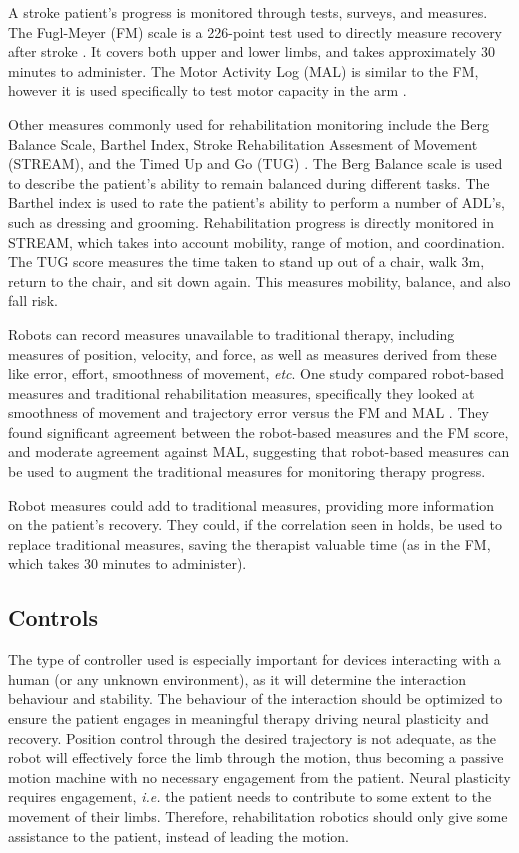 \documentclass[12pt]{report}
\begin{document}
	A stroke patient's progress is monitored through tests, surveys, and measures. The Fugl-Meyer (FM) scale is a 226-point test used to directly measure recovery after stroke \cite{Gladstone2002}. It covers both upper and lower limbs, and takes approximately 30 minutes to administer. The Motor Activity Log (MAL) is similar to the FM, however it is used specifically to test motor capacity in the arm \cite{Uswatte2006}.

Other measures commonly used for rehabilitation monitoring include the Berg Balance Scale, Barthel Index, Stroke Rehabilitation Assesment of Movement (STREAM), and the Timed Up and Go (TUG) \cite{Salbach2001}. The Berg Balance scale is used to describe the patient's ability to remain balanced during different tasks. The Barthel index is used to rate the patient's ability to perform a number of ADL's, such as dressing and grooming. Rehabilitation progress is directly monitored in STREAM, which takes into account mobility, range of motion, and coordination. The TUG score measures the time taken to stand up out of a chair, walk 3m, return to the chair, and sit down again. This measures mobility, balance, and also fall risk. 

Robots can record measures unavailable to traditional therapy, including measures of position, velocity, and force, as well as measures derived from these like error, effort, smoothness of movement, \textit{etc}. One study compared robot-based measures and traditional rehabilitation measures, specifically they looked at smoothness of movement and trajectory error versus the FM and MAL \cite{Celik2008}. They found significant agreement between the robot-based measures and the FM score, and moderate agreement against MAL, suggesting that robot-based measures can be used to augment the traditional measures for monitoring therapy progress. 

Robot measures could add to traditional measures, providing more information on the patient's recovery. They could, if the correlation seen in \cite{Celik2008} holds, be used to replace traditional measures, saving the therapist valuable time (as in the FM, which takes 30 minutes to administer). 

	
	\subsection{Controls} 
	
	The type of controller used is especially important for devices interacting with a human (or any unknown environment), as it will determine the interaction behaviour and stability. The behaviour of the interaction should be optimized to ensure the patient engages in meaningful therapy driving neural plasticity and recovery. Position control through the desired trajectory is not adequate, as the robot will effectively force the limb through the motion, thus becoming a passive motion machine with no necessary engagement from the patient. Neural plasticity requires engagement, \textit{i.e.} the patient needs to contribute to some extent to the movement of their limbs. Therefore, rehabilitation robotics should only give some assistance to the patient, instead of leading the motion. 
	
\end{document}

